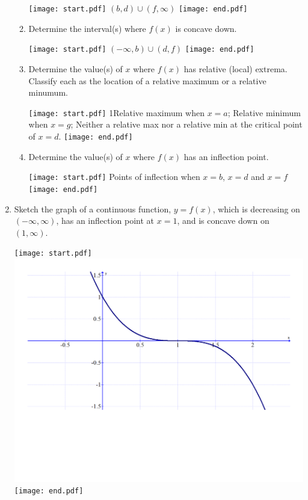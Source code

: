 \documentclass[12pt]{article}
\begin{document}
\begin{enumerate}
\begin{enumerate}
\texttt{[image: start.pdf]}
{{$(b,d) \cup (f,\infty)$}}
\texttt{[image: end.pdf]}


\item Determine the interval(s) where $f(x)$ is concave down.

\texttt{[image: start.pdf]}
{{$(-\infty,b) \cup (d,f)$}}
\texttt{[image: end.pdf]}


\item Determine the value(s) of $x$ where $f(x)$ has relative (local) extrema.  Classify each as the location of a relative maximum or a relative minumum.

\texttt{[image: start.pdf]}
{{{1\linewidth}{Relative maximum when $x=a$; Relative minimum when $x=g$; Neither a relative max nor a relative min at the critical point of $x=d$.}}}
\texttt{[image: end.pdf]}


\item Determine the value(s) of $x$ where $f(x)$ has an inflection point.

\texttt{[image: start.pdf]}
{{Points of inflection when $x=b$, $x=d$ and $x=f$}}
\texttt{[image: end.pdf]}


\end{enumerate}

\item Sketch the graph of a continuous function, $y=f(x)$, which is decreasing on $(-\infty,\infty)$, has an inflection point at $x=1$, and is concave down on $(1,\infty)$.

\texttt{[image: start.pdf]}
{{\includegraphics[scale=0.25]{graph1.pdf}}}
\texttt{[image: end.pdf]}



\end{enumerate}
\end{document}
